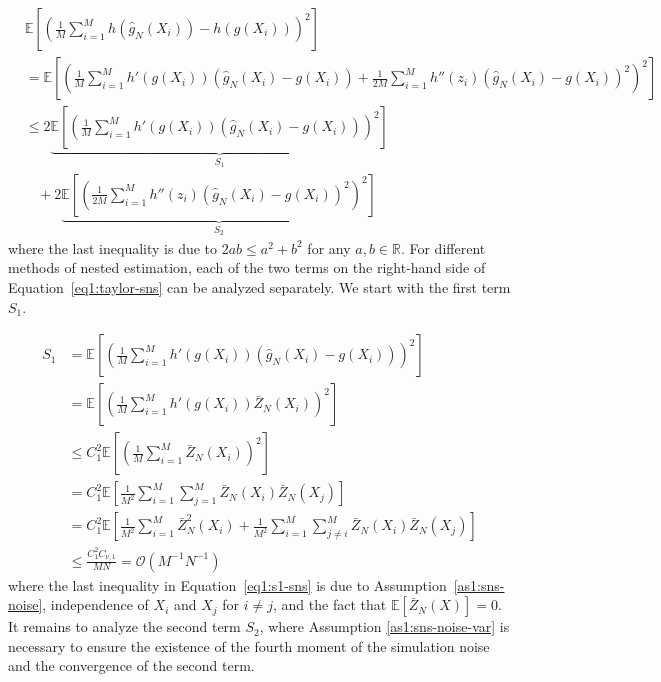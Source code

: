 \begin{align} \label{eq1:taylor-sns}
    & \mathbb{E} \left[  \left( \frac{1}{M} \sum_{i=1}^M h\left( \hat{g}_{N}(X_i) \right) -  h\left(g(X_i) \right)  \right)^2\right] \nonumber \\
    & = \mathbb{E} \left[ \left( \frac{1}{M} \sum_{i=1}^M h'\left( g(X_i) \right) \left( \hat{g}_{N}(X_i) - g(X_i) \right) +  \frac{1}{2M} \sum_{i=1}^M h''\left( z_i \right) \left( \hat{g}_{N}(X_i) - g(X_i) \right)^2 \right)^2\right] \nonumber \\
    & \leq 2 \underbrace{\mathbb{E} \left[ \left( \frac{1}{M} \sum_{i=1}^M h'\left( g(X_i) \right) \left( \hat{g}_{ N}(X_i) - g(X_i) \right) \right)^2\right]}_{S_1} \nonumber \\
    & ~~~~ + 2 \underbrace{\mathbb{E} \left[ \left( \frac{1}{2M} \sum_{i=1}^M h''\left( z_i \right) \left( \hat{g}_{N}(X_i) - g(X_i) \right)^2 \right)^2\right]}_{S_2}
\end{align}
where the last inequality is due to $2ab \leq a^2 + b^2$ for any $a, b \in \mathbb{R}$. 
For different methods of nested estimation, each of the two terms on the right-hand side of Equation~\ref{eq1:taylor-sns} can be analyzed separately.
We start with the first term $S_1$.


\begin{align} \label{eq1:s1-sns}
    S_1 
    & = \mathbb{E} \left[ \left(\frac{1}{M} \sum_{i=1}^M h'\left( g(X_i) \right) \left( \hat{g}_{N}(X_i) - g(X_i) \right) \right)^2 \right] \nonumber \\
    & = \mathbb{E} \left[ \left(\frac{1}{M} \sum_{i=1}^M h'\left( g(X_i) \right) \bar{Z}_N(X_i) \right)^2 \right] \nonumber \\
    & \leq C_1^2 \mathbb{E} \left[ \left(\frac{1}{M} \sum_{i=1}^M \bar{Z}_N(X_i) \right)^2 \right] \nonumber \\
    & = C_1^2 \mathbb{E} \left[ \frac{1}{M^2} \sum_{i=1}^M \sum_{j=1}^M \bar{Z}_N(X_i) \bar{Z}_N(X_j) \right] \nonumber \\
    & = C_1^2 \mathbb{E} \left[ \frac{1}{M^2} \sum_{i=1}^M \bar{Z}_N^2(X_i) + \frac{1}{M^2} \sum_{i=1}^M \sum_{j \neq i}^M \bar{Z}_N(X_i) \bar{Z}_N(X_j) \right] \nonumber \\
    & \leq  \frac{C_1^2 C_{\nu, 1}}{MN} = \mathcal{O}(M^{-1} N^{-1})
\end{align}
where the last inequality in Equation~\ref{eq1:s1-sns} is due to Assumption~\ref{as1:sns-noise}, independence of $X_i$ and $X_j$ for $i \neq j$, and the fact that $\mathbb{E} \left[ \bar{Z}_N(X) \right] = 0$. 
It remains to analyze the second term $S_2$, where Assumption \ref{as1:sns-noise-var} is necessary to ensure the existence of the fourth moment of the simulation noise and the convergence of the second term.

